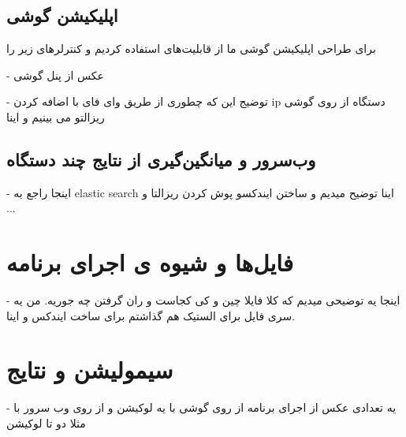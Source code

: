 \subsection{اپلیکیشن گوشی}
برای طراحی اپلیکیشن گوشی ما از قابلیت‌های 
استفاده کردیم و کنترلر‌های 
زیر را 

- عکس از پنل گوشی

- توضیج این که چطوری از طریق وای فای با اضافه کردن ip دستگاه از روی گوشی ریزالتو می بینیم و اینا

\subsection{وب‌سرور و میانگین‌گیری از نتایج چند دستگاه}
- اینجا راجع به  
elastic search
 اینا توضیح میدیم و ساختن ایندکسو پوش کردن ریزالتا و ...

\section{فایل‌ها و شیوه ‌ی اجرای برنامه}
- اینجا یه توضیحی میدیم که کلا فایلا چین و کی کجاست و ران گرفتن چه جوریه. من یه سری فایل برای الستیک هم گذاشتم برای ساخت ایندکس و اینا. 

\section{سیمولیشن و نتایج}
- یه تعدادی عکس از اجرای برنامه از روی گوشی با یه لوکیشن و از روی وب سرور با مثلا دو تا لوکیشن


